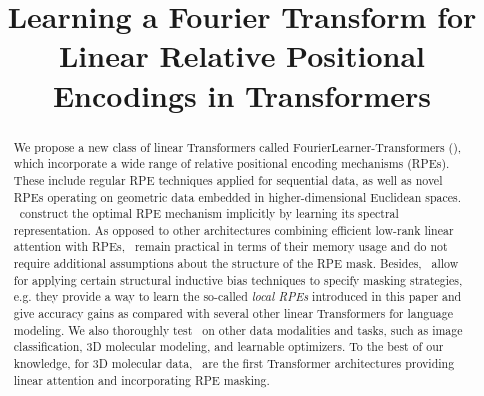 \title{Learning a Fourier Transform for Linear Relative Positional Encodings in Transformers}






\begin{abstract}
We propose a new class of linear Transformers called $\mathrm{FourierLearner}$-$\mathrm{Transformers}$ (\FLTs), which incorporate a wide range of relative positional encoding mechanisms (RPEs). These include regular RPE techniques applied for sequential data, as well as novel RPEs operating on geometric data embedded in higher-dimensional Euclidean spaces. \FLTs\ construct the optimal RPE mechanism implicitly by learning its spectral representation. As opposed to other architectures combining efficient low-rank linear attention with RPEs, \FLTs\ remain practical in terms of their memory usage and do not require additional assumptions about the structure of the RPE mask. Besides, \FLTs\ allow for applying certain structural inductive bias techniques to specify masking strategies, e.g. they provide a way to learn the so-called \textit{local RPEs} introduced in this paper and give accuracy gains as compared with several other linear Transformers for language modeling. We also thoroughly test \FLTs\ on other data modalities and tasks, such as image classification, 3D molecular modeling, and learnable optimizers. To the best of our knowledge, for 3D molecular data, \FLTs\ are the first Transformer architectures providing linear attention and incorporating RPE masking.
\end{abstract}


